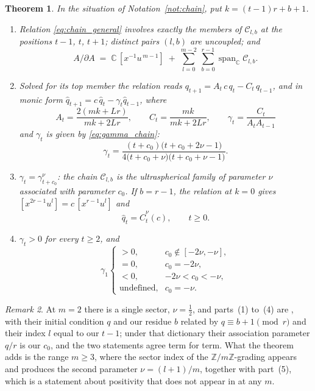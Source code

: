 \documentclass[11pt]{amsart}
\newtheorem{theorem}{Theorem}[section]
\theoremstyle{definition}
\theoremstyle{remark}
\newtheorem{remark}[theorem]{Remark}
\newcommand{\C}{\mathbb{C}}
\newcommand{\Z}{\mathbb{Z}}
\newcommand{\pa}{\partial}
\begin{document}
\begin{theorem}\label{thm:chains}
In the situation of Notation~\ref{not:chain}, put $k=(t-1)r+b+1$.
\begin{enumerate}
\item Relation \eqref{eq:chain_general} involves exactly the members of
$\mathcal C_{l,b}$ at the positions $t-1$, $t$, $t+1$; distinct pairs $(l,b)$
are uncoupled; and
\[
  A/\pa A \;=\; \C\,[x^{-1}u^{\,m-1}]
  \;+\;\sum_{l=0}^{m-2}\ \sum_{b=0}^{r-1}\operatorname{span}_\C\mathcal C_{l,b}.
\]
\item Solved for its top member the relation reads
$q_{t+1}=A_t\,c\,q_t-C_t\,q_{t-1}$, and in monic form
$\hat q_{t+1}=c\,\hat q_t-\gamma_t\hat q_{t-1}$, where
\[
  A_t=\frac{2(mk+Lr)}{mk+2Lr},\qquad
  C_t=\frac{mk}{mk+2Lr},\qquad
  \gamma_t=\frac{C_t}{A_tA_{t-1}}
\]
and $\gamma_t$ is given by \eqref{eq:gamma_chain}\textup{:}
\begin{equation}\label{eq:gamma_chain}
  \gamma_t=\frac{(t+c_0)\bigl(t+c_0+2\nu-1\bigr)}
                {4\bigl(t+c_0+\nu\bigr)\bigl(t+c_0+\nu-1\bigr)} .
\end{equation}
\item $\gamma_t=\gamma^{\nu}_{t+c_0}$\textup{:} the chain $\mathcal C_{l,b}$ is
the ultraspherical family of parameter $\nu$ associated with parameter $c_0$.
If $b=r-1$, the relation at $k=0$ gives $[x^{2r-1}u^{l}]=c\,[x^{r-1}u^{l}]$ and
\[
  \hat q_t=\hat C^{\nu}_t(c),\qquad t\geq0 .
\]
\item $\gamma_t>0$ for every $t\geq2$, and
\[
  \gamma_1
  \begin{cases}
    >0, & c_0\notin[-2\nu,-\nu],\\
    =0, & c_0=-2\nu,\\
    <0, & -2\nu<c_0<-\nu,\\
    \text{undefined}, & c_0=-\nu.
  \end{cases}
\]
\end{enumerate}
\end{theorem}

\begin{remark}\label{rem:chains_attribution}
At $m=2$ there is a single sector, $\nu=\tfrac12$, and parts~(1) to~(4) are
\cite[\S2.4]{CoxZhao2018}, with their initial condition $q$ and our residue $b$
related by $q\equiv b+1 \pmod r$ and their index $l$ equal to our $t-1$; under
that dictionary their association parameter $q/r$ is our $c_0$, and the two
statements agree term for term. What the theorem adds is the range $m\geq3$,
where the sector index of the $\Z/m\Z$-grading appears and produces the second
parameter $\nu=(l+1)/m$, together with part~(5), which is a statement about
positivity that does not appear in \cite{CoxZhao2018} at any $m$.
\end{remark}
\end{document}
